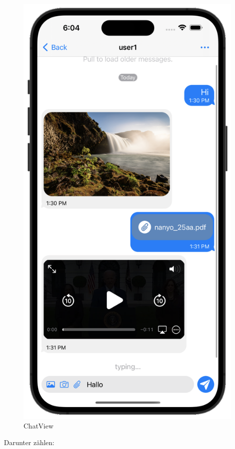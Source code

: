     \begin{figure}[h]
        \includegraphics[scale=0.5]{chat_white}
        \centering
        \caption{ChatView}\label{fig:chatview}
    \end{figure}
    Darunter zählen:
